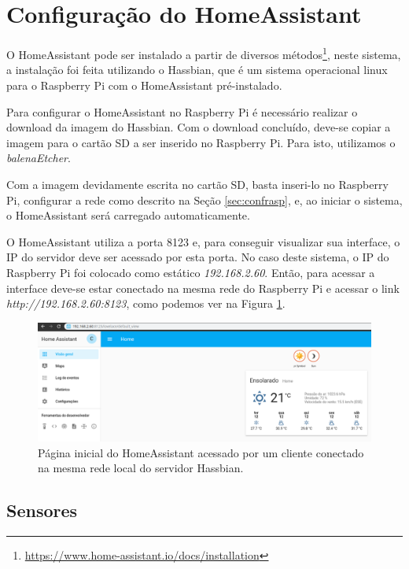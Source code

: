 \newpage

\section{Configuração do HomeAssistant}

O HomeAssistant pode ser instalado a partir de diversos métodos\footnote{\url{https://www.home-assistant.io/docs/installation}}, neste sistema, a instalação foi feita utilizando o Hassbian, que é um sistema operacional linux para o Raspberry Pi com o HomeAssistant pré-instalado.

Para configurar o HomeAssistant no Raspberry Pi é necessário realizar o download da imagem do Hassbian. Com o download concluído, deve-se copiar a imagem para o cartão SD a ser inserido no Raspberry Pi. Para isto, utilizamos o \textit{balenaEtcher}.

Com a imagem devidamente escrita no cartão SD, basta inseri-lo no Raspberry Pi, configurar a rede como descrito na Seção \ref{sec:confrasp}, e, ao iniciar o sistema, o HomeAssistant será carregado automaticamente.

O HomeAssistant utiliza a porta 8123 e, para conseguir visualizar sua interface, o IP do servidor deve ser acessado por esta porta. No caso deste sistema, o IP do Raspberry Pi foi colocado como estático \textit{192.168.2.60}. Então, para acessar a interface deve-se estar conectado na mesma rede do Raspberry Pi e acessar o link \textit{http://192.168.2.60:8123}, como podemos ver na Figura \ref{fig:homeassistanthome}.

\begin{figure}[htbp]
	\centering
	\includegraphics[width=1\linewidth]{figuras/homeassistanthome.png}
	\caption{Página inicial do HomeAssistant acessado por um cliente conectado na mesma rede local do servidor Hassbian.}
	\label{fig:homeassistanthome}
\end{figure}

\subsection{Sensores}

